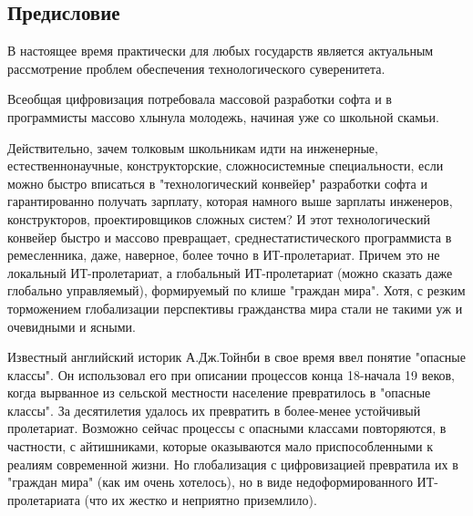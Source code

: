 \begin{partbacktext}
\part*{Предисловие}
\label{part_preface}

В настоящее время практически для любых государств является актуальным рассмотрение проблем обеспечения технологического суверенитета.

Всеобщая цифровизация потребовала массовой разработки софта и в программисты массово хлынула молодежь, начиная уже со школьной скамьи.

Действительно, зачем толковым школьникам идти на инженерные, естественнонаучные, конструкторские, сложносистемные специальности, если можно быстро вписаться в "технологический конвейер"{} разработки софта и гарантированно получать зарплату, которая намного выше зарплаты инженеров, конструкторов, проектировщиков сложных систем? И этот технологический конвейер быстро и массово превращает, среднестатистического программиста в ремесленника, даже, наверное, более точно в ИТ-пролетариат. Причем это не локальный ИТ-пролетариат, а глобальный ИТ-пролетариат (можно сказать даже глобально управляемый), формируемый по клише "граждан мира"{}. Хотя, с резким торможением глобализации перспективы гражданства мира стали не такими уж и очевидными и ясными.

Известный английский историк А.Дж.Тойнби в свое время ввел понятие "опасные классы"{}. Он использовал его при описании процессов конца 18-начала 19 веков, когда вырванное из сельской местности население превратилось в "опасные классы"{}. За десятилетия удалось их превратить в более-менее устойчивый пролетариат. Возможно сейчас процессы с опасными классами повторяются, в частности, с айтишниками, которые оказываются мало приспособленными к реалиям современной жизни. Но глобализация с цифровизацией превратила их в "граждан мира"{} (как им очень хотелось), но в виде недоформированного ИТ-пролетариата (что их жестко и неприятно приземлило).


\end{partbacktext}
